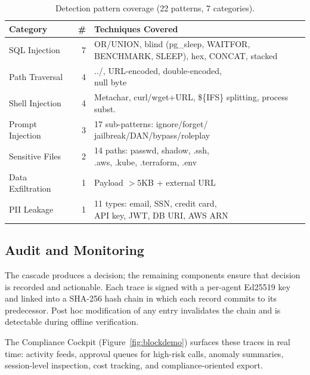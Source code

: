 \documentclass[sigplan,review,anonymous]{acmart}
\begin{document}
\begin{table}[t]
\centering
\footnotesize
\caption{Detection pattern coverage (22 patterns, 7 categories).}
\vspace{-0.1in}
\label{tab:patterns}
\setlength{\tabcolsep}{2.5pt}
\begin{tabular}{lrl}
\toprule
\textbf{Category} & \textbf{\#} & \textbf{Techniques Covered} \\
\midrule
SQL Injection       & 7 & \makecell[tl]{OR/UNION, blind (pg\_sleep, WAITFOR,\\BENCHMARK, SLEEP), hex, CONCAT, stacked} \\
Path Traversal      & 4 & \makecell[tl]{../, URL-encoded, double-encoded,\\null byte} \\
Shell Injection     & 4 & \makecell[tl]{Metachar, curl/wget+URL,\\\$\{IFS\} splitting, process subst.} \\
Prompt Injection    & 3 & \makecell[tl]{17 sub-patterns: ignore/forget/\\jailbreak/DAN/bypass/roleplay} \\
Sensitive Files     & 2 & \makecell[tl]{14 paths: passwd, shadow, .ssh,\\.aws, .kube, .terraform, .env} \\
Data Exfiltration   & 1 & Payload $>$5KB + external URL \\
PII Leakage         & 1 & \makecell[tl]{11 types: email, SSN, credit card,\\API key, JWT, DB URI, AWS ARN} \\
\bottomrule
\end{tabular}
\vspace{-0.15in}
\end{table}

\subsection{Audit and Monitoring}
\label{audit-layer}

The cascade produces a decision; the remaining components ensure that decision is recorded and actionable.
Each trace is signed with a per-agent Ed25519 key~\cite{bernstein2012eddsa} and linked into a SHA-256 hash chain in which each record commits to its predecessor. Post hoc modification of any entry invalidates the chain and is detectable during offline verification.

The Compliance Cockpit (Figure~\ref{fig:blockdemo}) surfaces these traces in real time: activity feeds, approval queues for high-risk calls, anomaly summaries, session-level inspection, cost tracking, and compliance-oriented export.
\end{document}
